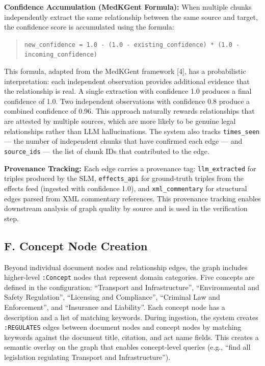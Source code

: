 \documentclass[10pt, a4paper, twocolumn]{article}
\begin{document}
\textbf{Confidence Accumulation (MedKGent Formula):} When multiple chunks independently extract the same relationship between the same source and target, the confidence score is accumulated using the formula:

\begin{quote}
\texttt{new\_confidence = 1.0 - (1.0 - existing\_confidence) * (1.0 - incoming\_confidence)}
\end{quote}

This formula, adapted from the MedKGent framework [4], has a probabilistic interpretation: each independent observation provides additional evidence that the relationship is real. A single extraction with confidence 1.0 produces a final confidence of 1.0. Two independent observations with confidence 0.8 produce a combined confidence of 0.96. This approach naturally rewards relationships that are attested by multiple sources, which are more likely to be genuine legal relationships rather than LLM hallucinations. The system also tracks \texttt{times\_seen} — the number of independent chunks that have confirmed each edge — and \texttt{source\_ids} — the list of chunk IDs that contributed to the edge.

\textbf{Provenance Tracking:} Each edge carries a provenance tag: \texttt{llm\_extracted} for triples produced by the SLM, \texttt{effects\_api} for ground-truth triples from the effects feed (ingested with confidence 1.0), and \texttt{xml\_commentary} for structural edges parsed from XML commentary references. This provenance tracking enables downstream analysis of graph quality by source and is used in the verification step.

\subsection{F. Concept Node Creation}
Beyond individual document nodes and relationship edges, the graph includes higher-level \texttt{:Concept} nodes that represent domain categories. Five concepts are defined in the configuration: ``Transport and Infrastructure'', ``Environmental and Safety Regulation'', ``Licensing and Compliance'', ``Criminal Law and Enforcement'', and ``Insurance and Liability''. Each concept node has a description and a list of matching keywords. During ingestion, the system creates \texttt{:REGULATES} edges between document nodes and concept nodes by matching keywords against the document title, citation, and act name fields. This creates a semantic overlay on the graph that enables concept-level queries (e.g., ``find all legislation regulating Transport and Infrastructure'').
\end{document}
